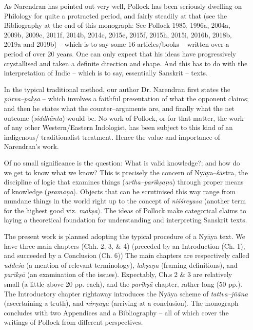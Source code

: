 As Narendran has pointed out very well, Pollock has been seriously dwelling on Philology for quite a protracted period, and fairly steadily at that (see the Bibliography at the end of this monograph: See Pollock 1985, 1996a, 2004a, 2009b, 2009c, 2011f, 2014b, 2014c, 2015e, 2015f, 2015h, 2015i, 2016b, 2018b, 2019a and 2019b) – which is to say some 16 articles/books – written over a period of over 20 years. One can only expect that his ideas have progressively crystallised and taken a definite direction and shape. And this has to do with the interpretation of Indic – which is to say, essentially Sanskrit – texts.

In the typical traditional method, our author Dr. Narendran first states the \textit{pūrva–pakṣa} – which involves a faithful presentation of what the opponent claims; and then he states what the counter–arguments are, and finally what the net outcome (\textit{siddhānta}) would be. No work of Pollock, or for that matter, the work of any other Western/Eastern Indologist, has been subject to this kind of an indigenous/ traditionalist treatment. Hence the value and importance of Narendran’s work.

Of no small significance is the question: What is valid knowledge?; and how do we get to know what we know? This is precisely the concern of Nyāya–śāstra, the discipline of logic that examines things (\textit{artha–parīkṣaṇa}) through proper means of knowledge (\textit{pramāṇa}). Objects that can be scrutinised this way range from mundane things in the world right up to the concept of \textit{niśśreyasa} (another term for the highest good viz. \textit{mokṣa}). The ideas of Pollock make categorical claims to laying a theoretical foundation for understanding and interpreting Sanskrit texts.

The present work is planned adopting the typical procedure of a Nyāya text. We have three main chapters (Chh. 2, 3, \& 4) (preceded by an Introduction (Ch. 1), and succeeded by a Conclusion (Ch. 6)) The main chapters are respectively called \textit{uddeśa} (a mention of relevant terminology), \textit{lakṣaṇa} (framing definitions), and \textit{parīkṣā} (an examination of the issues). Expectably, Ch.s 2 \& 3 are relatively small (a little above 20 pp. each), and the \textit{parīkṣā} chapter, rather long (50 pp.). The Introductory chapter rightaway introduces the Nyāya scheme of \textit{tattva–jñāna} (ascertaining a truth), and \textit{nirṇaya} (arriving at a conclusion). The monograph concludes with two Appendices and a Bibliography – all of which cover the writings of Pollock from different perspectives.

